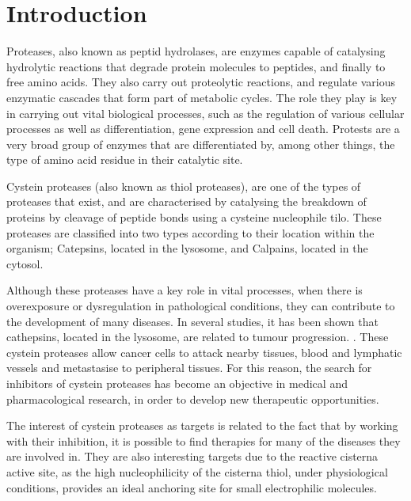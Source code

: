 \documentclass[final,times,twocolumn,article]{elsarticle}
\begin{document}



\section{Introduction}

Proteases, also known as peptid hydrolases, are enzymes capable of catalysing hydrolytic reactions that degrade protein molecules to peptides, and finally to free amino acids. They also carry out proteolytic reactions, and regulate various enzymatic cascades that form part of metabolic cycles. \cite{Ramos2019} The role they play is key in carrying out vital biological processes, such as the regulation of various cellular processes as well as differentiation, gene expression and cell death. Protests are a very broad group of enzymes that are differentiated by, among other things, the type of amino acid residue in their catalytic site. \cite{Ramos2019}

Cystein proteases (also known as thiol proteases), are one of the types of proteases that exist, and are characterised by catalysing the breakdown of proteins by cleavage of peptide bonds using a cysteine nucleophile tilo. These proteases are classified into two types according to their location within the organism; Catepsins, located in the lysosome, and Calpains, located in the cytosol. \cite{Gupta2020}

Although these proteases have a key role in vital processes, when there is overexposure or dysregulation in pathological conditions, they can contribute to the development of many diseases.  In several studies, it has been shown that cathepsins, located in the lysosome, are related to tumour progression. \cite{Berdowska2004} \cite{Mohamed2006}. These cystein proteases allow cancer cells to attack nearby tissues, blood and lymphatic vessels and metastasise to peripheral tissues. \cite{Gupta2020} \cite{Gocheva2006} For this reason, the search for inhibitors of cystein proteases has become an objective in medical and pharmacological research, in order to develop new therapeutic opportunities. \cite{cath}

The interest of cystein proteases as targets is related to the fact that by working with their inhibition, it is possible to find therapies for many of the diseases they are involved in. They are also interesting targets due to the reactive cisterna active site, as the high nucleophilicity of the cisterna thiol, under physiological conditions, provides an ideal anchoring site for small electrophilic molecules. \cite{Maurais2019} 
\end{document}
